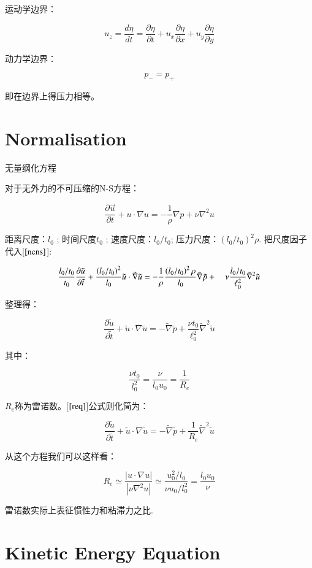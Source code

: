 \documentclass[fontset=windows]{report}
\begin{document}
运动学边界：

\[u_z=\frac{d\eta}{dt}=\frac{\partial \eta}{\partial t}+u_x\frac{\partial \eta}{\partial x}+u_y\frac{\partial \eta}{\partial y}\]

动力学边界：

\[p_{-}=p_{+}\]

即在边界上得压力相等。

\section{Normalisation}

无量纲化方程

对于无外力的不可压缩的N-S方程：

\[\frac{{\partial}\vec u}{{\partial}t}+u\cdot \nabla u=
-\frac{1}{\rho}\nabla p+
\nu\nabla^2 u \label{ncns}\]

距离尺度：\(l_0\) ; 时间尺度\(t_0\) ; 速度尺度：\(l_0/t_0\);
压力尺度：\((l_0/t_0)^2\rho\). 把尺度因子代入{[}\(\ref{ncns}\){]}:

\[\frac{l_{0} / t_{0}}{t_{0}} \frac{\partial \tilde{u}}{\partial \tilde{t}}
+\frac{\left(l_{0} / t_{0}\right)^{2}}{l_{0}} \tilde{u} \cdot \tilde{\nabla} \tilde{u} 
\\=-\frac{1}{\rho} \frac{\left(l_{0} / t_{0}\right)^{2} \rho}{l_{0}} \tilde{\nabla} \tilde{p}+ 
\quad \nu \frac{l_{0} / t_{0}}{\ell_{0}^{2}} \tilde{\nabla}^{2} \tilde{u}\]

整理得：

\[\frac{\partial \tilde{u}}{\partial \widetilde{t}}
+\tilde{u} \cdot {\nabla} \tilde{u} 
=- \tilde{\nabla} \tilde{p}+ 
\frac{\nu t_{0}}{\ell_{0}^{2}} \tilde{\nabla}^{2} \tilde{u}
\label{req}\]

其中：

\[\frac{\nu t_0}{l_0^2}=\frac{\nu}{l_0u_0}=\frac{1}{R_e}\]

\(R_e\)称为雷诺数。{[}\(\ref{req}\){]}公式则化简为：

\[\frac{\partial \tilde{u}}{\partial \widetilde{t}}
+\tilde{u} \cdot {\nabla} \tilde{u} 
=- \tilde{\nabla} \tilde{p}+ 
\frac{1}{R_e} \tilde{\nabla}^{2} \tilde{u}\]

从这个方程我们可以这样看：

\[R_e\simeq\frac{|u\cdot\nabla u|}{|\nu \nabla^2u|}\simeq\frac{u_0^2/l_0}{\nu u_0/l_0^2}=\frac{l_0u_0}{\nu}\]

雷诺数实际上表征惯性力和粘滞力之比.

\hypertarget{36-kinetic-energy-equation}{%
\section{Kinetic Energy
Equation}\label{36-kinetic-energy-equation}}
\end{document}
